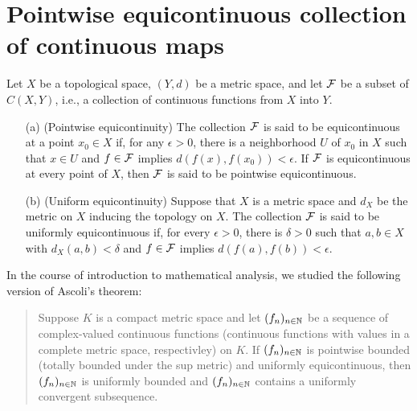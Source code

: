 \section{Pointwise equicontinuous collection of continuous maps}

\begin{defi}[Equicontinuity]
    Let $X$ be a topological space, $(Y, d)$ be a metric space, and let ${\mathcal{F}}$ be a subset of $C(X, Y)$, i.e., a collection of continuous functions from $X$ into $Y$.
    \begin{enumerate}
        \item[(a)]
        {
            (Pointwise equicontinuity)
            The collection ${\mathcal{F}}$ is said to be equicontinuous at a point $x_0\in X$ if, for any $\epsilon>0$, there is a neighborhood $U$ of $x_0$ in $X$ such that $x\in U$ and $f\in{\mathcal{F}}$ implies $d(f(x), f(x_0))<\epsilon$.
            If ${\mathcal{F}}$ is equicontinuous at every point of $X$, then ${\mathcal{F}}$ is said to be pointwise equicontinuous.
        }
        \item[(b)]
        {
            (Uniform equicontinuity)
            Suppose that $X$ is a metric space and $d_X$ be the metric on $X$ inducing the topology on $X$.
            The collection ${\mathcal{F}}$ is said to be uniformly equicontinuous if, for every $\epsilon>0$, there is $\delta>0$ such that $a, b\in X$ with $d_X(a, b)<\delta$ and $f\in{\mathcal{F}}$ implies $d(f(a), f(b))<\epsilon$.
        }
    \end{enumerate}
\end{defi}
\begin{rmk}
    In the course of introduction to mathematical analysis, we studied the following version of Ascoli's theorem:
    \begin{quotation}
        Suppose $K$ is a compact metric space and let $(f_n)_{n\in{\mathbb{N}}}$ be a sequence of complex-valued continuous functions (continuous functions with values in a complete metric space, respectivley) on $K$.
        If $(f_n)_{n\in{\mathbb{N}}}$ is pointwise bounded (totally bounded under the sup metric) and uniformly equicontinuous, then $(f_n)_{n\in{\mathbb{N}}}$ is uniformly bounded and $(f_n)_{n\in{\mathbb{N}}}$ contains a uniformly convergent subsequence.
    \end{quotation}
\end{rmk}

